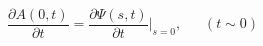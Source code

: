 \begin{equation}
\frac{\partial A(0,t)}{\partial t} =
\frac{\partial\Psi(s,t)}{\partial t}\big|_{s=0},\ \ \ \ \ \ \
(t \sim 0)
\label{8}
\end{equation}

